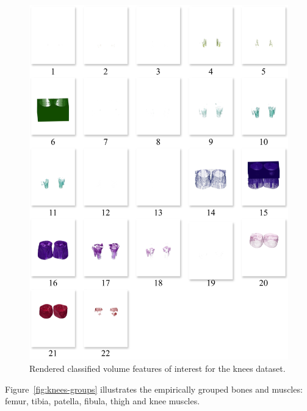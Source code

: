 \begin{figure}[htb!]
    \centering
    \includegraphics[width=\columnwidth]{figs/knees-clusters.jpg} 
    \caption{Rendered classified volume features of interest for the knees dataset.}
    \label{fig:knees-clusters}
\end{figure}

Figure~\ref{fig:knees-groups} illustrates the empirically grouped bones and muscles: femur, tibia, patella, fibula, thigh and knee muscles.

